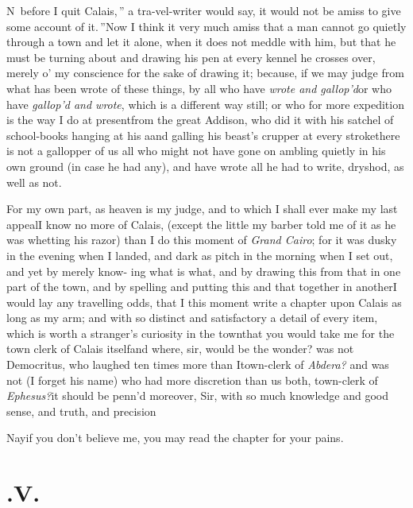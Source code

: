 \documentclass{article}
\begin{document}
\lettrine{\lower-10pt\hbox{\normalsize\large\lqq}N}{\,} before I quit
Calais,\,” a tra-\break vel-writer would say, \lqq it would\break
\lqq not be amiss to give some account of\break
\lqq it.\,”\tsk Now I think it very much amiss\break
\tsk that a man
cannot go quietly through a town and let it alone, when it does not meddle with him,
but that he must be turning about and drawing his pen at every kennel he crosses
over, merely o’ my conscience for the sake of drawing it; because, if we may judge
from what has been wrote of these things, by all who have \textit{wrote and
gallop’d}\tsk or who have \textit{gallop’d and wrote}, which is a different way still;
or who for more expedition\pb 
{} is
the way I do at present\tsk from the great Addison, who did it with his
satchel of school-books hanging at his a\tsk and galling his beast’s crupper at
every stroke\break\tsk there is not a gallopper of us all who might not have gone on ambling
quietly in his own ground (in case he had any), and have wrote all he had to write,
dry\break shod, as well as not.

For my own part, as heaven is my judge, and to which I shall ever make my last
appeal\tsk I know no more of Calais, (except the little my barber told me of it as he
was whetting his razor) than I do this moment of \textit{Grand Cairo}; for it was
dusky in the evening when I landed, and dark as pitch in the morning when I set out,
and yet by merely know-\pb
ing what is what, and by drawing this from that in one part of
the town, and by spelling and putting this and that together in another\tsk I would
lay any travelling odds, that I this moment write a chapter upon Calais as
long as my arm; and with so distinct and satisfactory a detail of every item, which
is worth a stranger’s curiosity in the town\tsk that you would take me for the
town clerk of Calais itself\tsk and where, sir, would be the wonder? was not
Democritus, who laughed ten times more than I\tsk town-clerk of
\textit{Abdera?} and was not (I forget his name) who had more discretion than us
both, town-clerk of \textit{Ephesus?}\tsh it should be penn’d moreover, Sir, with so
much knowledge and good sense, and truth, and precision\tsh

\newpage
\tsk Nay\tsk if you don’t believe me, you may read the
chapter for your pains.

\section{.\enspace V.}
\end{document}

